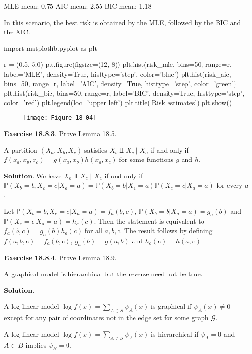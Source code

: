 \begin{console}
MLE mean: 0.75
AIC mean: 2.55
BIC mean: 1.18
\end{console}

In this scenario, the best risk is obtained by the MLE, followed by the
BIC and the AIC.

\begin{python}
import matplotlib.pyplot as plt

r = (0.5, 5.0)
plt.figure(figsize=(12, 8))
plt.hist(risk_mle, bins=50, range=r, label='MLE', density=True, histtype='step', color='blue')
plt.hist(risk_aic, bins=50, range=r, label='AIC', density=True, histtype='step', color='green')
plt.hist(risk_bic, bins=50, range=r, label='BIC', density=True, histtype='step', color='red')
plt.legend(loc='upper left')
plt.title('Risk estimates')
plt.show()
\end{python}

\begin{figure}[H]
\texttt{[image: Figure-18-04]}
\end{figure}

\textbf{Exercise 18.8.3}. Prove Lemma 18.5.

A partition \((X_a, X_b, X_c)\) satisfies
\(X_b \text{ ⫫ } X_c \; | \; X_a\) if and only if
\(f(x_a, x_b, x_c) = g(x_a, x_b) h(x_a, x_c)\) for some functions \(g\)
and \(h\).

\textbf{Solution}. We have \(X_b \text{ ⫫ } X_c \; | \; X_a\) if and
only if
\(\mathbb{P}(X_b = b, X_c = c | X_a = a) = \mathbb{P}(X_b = b | X_a = a) \mathbb{P}(X_c = c | X_a = a)\)
for every \(a\).

Let \(\mathbb{P}(X_b = b, X_c = c | X_a = a) = f_a(b, c)\),
\(\mathbb{P}(X_b = b | X_a = a) = g_a(b)\) and
\(\mathbb{P}(X_c = c | X_a = a) = h_a(c)\). Then the statement is
equivalent to \(f_a(b, c) = g_a(b) h_a(c)\) for all \(a, b, c\). The
result follows by defining \(f(a, b, c) = f_a(b, c)\),
\(g_a(b) = g(a, b)\) and \(h_a(c) = h(a, c)\).

\textbf{Exercise 18.8.4}. Prove Lemma 18.9.

A graphical model is hierarchical but the reverse need not be true.

\textbf{Solution}.

A log-linear model \(\log f(x) = \sum_{A \subset S} \psi_A(x)\) is
graphical if \(\psi_A(x) \neq 0\) except for any pair of coordinates not
in the edge set for some graph \(\mathcal{G}\).

A log-linear model \(\log f(x) = \sum_{A \subset S} \psi_A(x)\) is
hierarchical if \(\psi_A = 0\) and \(A \subset B\) implies
\(\psi_B = 0\).


